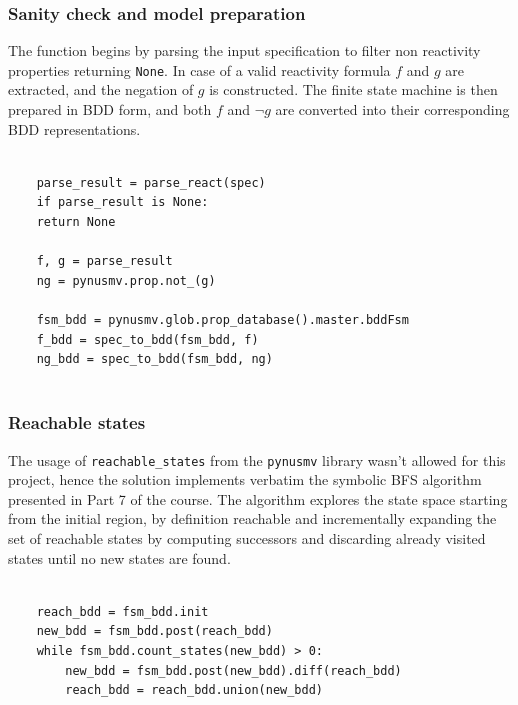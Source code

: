 \subsubsection*{Sanity check and model preparation}
The function begins by parsing the input specification to filter non reactivity properties returning \texttt{None}. In case of a valid reactivity formula \(f\) and \(g\) are extracted, and the negation of \(g\) is constructed. The finite state machine is then prepared in BDD form, and both \(f\) and \(\neg g\) are converted into their corresponding BDD representations.
\begin{scriptsize}
\begin{Verbatim}[commandchars=\\\{\}]

    parse_result = parse_react(spec)
    if parse_result is None:
    return None
    
    f, g = parse_result
    ng = pynusmv.prop.not_(g)
    
    fsm_bdd = pynusmv.glob.prop_database().master.bddFsm
    f_bdd = spec_to_bdd(fsm_bdd, f)
    ng_bdd = spec_to_bdd(fsm_bdd, ng)
        
\end{Verbatim}
\end{scriptsize}

\subsubsection*{Reachable states}
The usage of \texttt{reachable\_states} from the \texttt{pynusmv} library wasn't allowed for this project, hence the solution implements verbatim the symbolic BFS algorithm presented in Part 7 of the course. The algorithm explores the state space starting from the initial region, by definition reachable and incrementally expanding the set of reachable states by computing successors and discarding already visited states until no new states are found.
\begin{scriptsize}
\begin{verbatim}
        
    reach_bdd = fsm_bdd.init
    new_bdd = fsm_bdd.post(reach_bdd)
    while fsm_bdd.count_states(new_bdd) > 0:
        new_bdd = fsm_bdd.post(new_bdd).diff(reach_bdd)
        reach_bdd = reach_bdd.union(new_bdd)

\end{verbatim}
\end{scriptsize}

